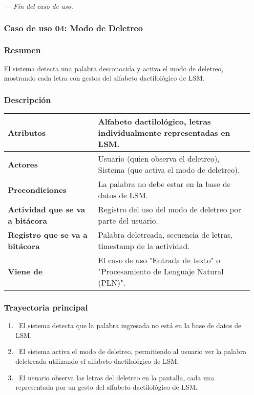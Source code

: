 \textit{--- Fin del caso de uso.}
\newpage
\subsubsection{Caso de uso 04: Modo de Deletreo}
\subsubsection{Resumen}
El sistema detecta una palabra desconocida y activa el modo de deletreo, mostrando cada letra con gestos del alfabeto dactilológico de LSM.
\subsubsection{Descripción}
\begin{table}[h]
    \centering
    \begin{longtable}{|l|p{10cm}|}  %
    \hline
    \textbf{Atributos} & Alfabeto dactilológico, letras individualmente representadas en LSM. \\ \hline
    \textbf{Actores} & Usuario (quien observa el deletreo), Sistema (que activa el modo de deletreo). \\ \hline
    \textbf{Precondiciones} & La palabra no debe estar en la base de datos de LSM. \\ \hline
    \textbf{Actividad que se va a bitácora} & Registro del uso del modo de deletreo por parte del usuario. \\ \hline
    \textbf{Registro que se va a bitácora} & Palabra deletreada, secuencia de letras, timestamp de la actividad. \\ \hline
    \textbf{Viene de} & El caso de uso "Entrada de texto" o "Procesamiento de Lenguaje Natural (PLN)". \\ \hline
     
    \end{longtable}
\end{table}
  
\subsubsection{Trayectoria principal}
\begin{enumerate}[label=\textbf{\arabic*}, leftmargin=1.5cm]
    \item \UCsystem \ El sistema detecta que la palabra ingresada no está en la base de datos de LSM.
    
    \item \UCsystem \ El sistema activa el modo de deletreo, permitiendo al usuario ver la palabra deletreada utilizando el alfabeto dactilológico de LSM.
    
    \item \UCactor \ El usuario observa las letras del deletreo en la pantalla, cada una representada por un gesto del alfabeto dactilológico de LSM.

\end{enumerate}

